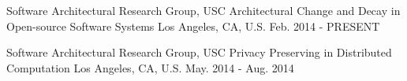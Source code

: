 \begin{cventries}
  \cventry
    {{Software Architectural Research Group}, USC} %
    {Architectural Change and Decay in Open-source Software Systems} %
    {Los Angeles, CA, U.S.} %
    {Feb. 2014 - PRESENT} %
    {
    }
   
\cventry
{{Software Architectural Research Group}, USC} %
{Privacy Preserving in Distributed Computation} %
{Los Angeles, CA, U.S.} %
{May. 2014 - Aug. 2014} %
{
}


\end{cventries}
